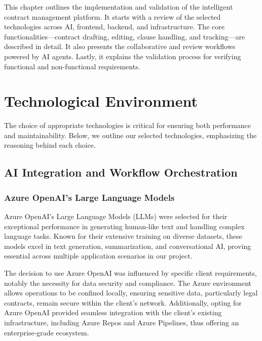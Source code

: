 This chapter outlines the implementation and validation of the intelligent contract management platform. It starts with a review of the selected technologies across AI, frontend, backend, and infrastructure. The core functionalities—contract drafting, editing, clause handling, and tracking—are described in detail. It also presents the collaborative and review workflows powered by AI agents. Lastly, it explains the validation process for verifying functional and non-functional requirements.

\newpage
{}
\hypertarget{fourthchapter}{}

\section{Technological Environment}
The choice of appropriate technologies is critical for ensuring both performance and maintainability. Below, we outline our selected technologies, emphasizing the reasoning behind each choice.

\subsection{AI Integration and Workflow Orchestration}

\subsubsection{Azure OpenAI's Large Language Models}
Azure OpenAI's Large Language Models (LLMs) were selected for their exceptional performance in generating human-like text and handling complex language tasks. Known for their extensive training on diverse datasets, these models excel in text generation, summarization, and conversational AI, proving essential across multiple application scenarios in our project.\mynewline

The decision to use Azure OpenAI was influenced by specific client requirements, notably the necessity for data security and compliance. The Azure environment allows operations to be confined locally, ensuring sensitive data, particularly legal contracts, remain secure within the client's network. Additionally, opting for Azure OpenAI provided seamless integration with the client's existing infrastructure, including Azure Repos and Azure Pipelines, thus offering an enterprise-grade ecosystem.\mynewline

